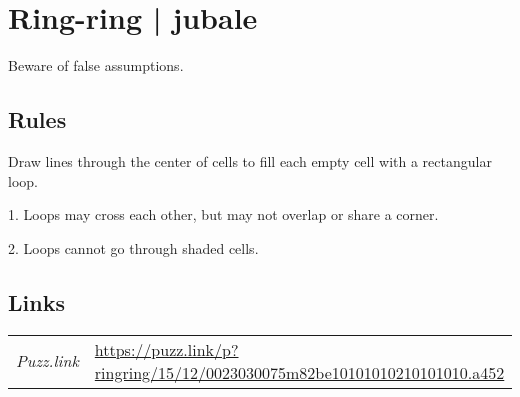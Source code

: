 \section[Ring-ring | jubale {[\emph{Ring-Ring}]}]{Ring-ring | {\normalfont jubale}}
\label{sec:26-ring-ring-jubale}
Beware of false assumptions.
\subsection*{Rules}
\begin{markdown}
Draw lines through the center of cells to fill each empty cell with a rectangular loop.



1. Loops may cross each other, but may not overlap or share a corner.

2. Loops cannot go through shaded cells.
\end{markdown}
\subsection*{Links}
\begin{tabularx}{\textwidth}{l X}
\emph{Puzz.link} & \url{https://puzz.link/p?ringring/15/12/0023030075m82be10101010210101010.a452} \\
\end{tabularx}
\pagebreak
